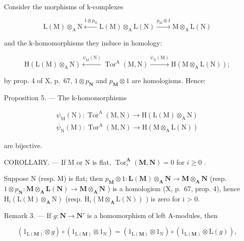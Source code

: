 Consider the morphisms of k-complexes

\[
\mathrm{L} (\mathrm{M}) \otimes_ {\mathrm{A}} \mathrm{N} \xleftarrow {1 \otimes p _ {\mathrm{N}}} \mathrm{L} (\mathrm{M}) \otimes_ {\mathrm{A}} \mathrm{L} (\mathrm{N}) \xrightarrow {p _ {\mathrm{M}} \otimes 1} \mathrm{M} \otimes_ {\mathrm{A}} \mathrm{L} (\mathrm{N})
\]

and the k-homomorphisms they induce in homology:

\[
\mathrm{H} (\mathrm{L} (\mathrm{M}) \otimes_ {\mathrm{A}} \mathrm{N}) \xleftarrow {\psi_ {\mathrm{M}} (\mathrm{N})} \operatorname{Tor} ^ {\mathrm{A}} (\mathrm{M}, \mathrm{N}) \xrightarrow {\overline {{\psi}} _ {\mathrm{N}} (\mathrm{M})} \mathrm{H} (\mathrm{M} \otimes_ {\mathrm{A}} \mathrm{L} (\mathrm{N}));
\]

by prop. 4 of X, p.~67, \(1 \otimes p_{\mathbf{N}}\) and \(p_{\mathbf{M}} \otimes 1\) are homologisms. Hence:

Proposition 5. --- The k-homomorphisms

\[
\begin{array}{l} \psi_ {\mathrm{M}} (\mathrm{N}): \operatorname{Tor} ^ {\mathrm{A}} (\mathrm{M}, \mathrm{N}) \to \mathrm{H} (\mathrm{L} (\mathrm{M}) \otimes_ {\mathrm{A}} \mathrm{N}) \\ \overline {{\psi}} _ {\mathrm{N}} (\mathrm{M}): \operatorname{Tor} ^ {\mathrm{A}} (\mathrm{M}, \mathrm{N}) \to \mathrm{H} (\mathrm{M} \otimes_ {\mathrm{A}} \mathrm{L} (\mathrm{N})) \end{array}
\]

are bijective.

COROLLARY. --- If M or N is flat, \(\operatorname{Tor}_{i}^{\mathbf{A}}(\mathbf{M},\mathbf{N}) = 0\) for \(i \geqslant 0\) .

Suppose N (resp. M) is flat; then \(p_{\mathbf{M}} \otimes 1 : \mathbf{L}(\mathbf{M}) \otimes_{\mathbf{A}} \mathbf{N} \to \mathbf{M} \otimes_{\mathbf{A}} \mathbf{N}\) (resp. \(1 \otimes p_{\mathbf{N}} : \mathbf{M} \otimes_{\mathbf{A}} \mathbf{L}(\mathbf{N}) \to \mathbf{M} \otimes_{\mathbf{A}} \mathbf{N}\) ) is a homologism (X, p.~67, prop. 4), hence \(\mathrm{H}_{i}(\mathrm{L}(\mathrm{M}) \otimes_{\mathbf{A}} \mathrm{N})\) (resp. \(\mathrm{H}_{i}(\mathrm{M} \otimes_{\mathbf{A}} \mathrm{L}(\mathrm{N}))\) ) is zero for i \textgreater{} 0.

Remark 3. --- If \(g: \mathbf{N} \to \mathbf{N}'\) is a homomorphism of left A-modules, then

\[
\left(1 _ {\mathrm{L} (\mathbf {M})} \otimes g\right) \circ \left(1 _ {\mathrm{L} (\mathbf {M})} \otimes 1 _ {\mathrm{N}}\right) = \left(1 _ {\mathrm{L} (\mathbf {M})} \otimes 1 _ {\mathrm{N}}\right) \circ \left(1 _ {\mathrm{L} (\mathbf {M})} \otimes \mathrm{L} (g)\right),
\]

